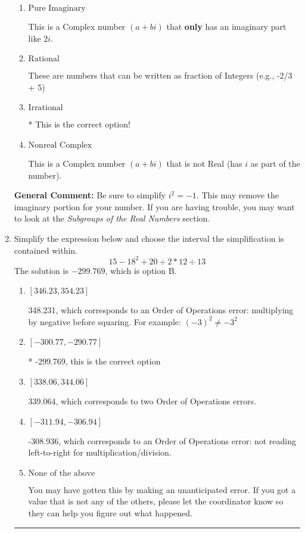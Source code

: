 \documentclass{extbook}[14pt]
\newcommand{\litem}[1]{\item #1

\rule{\textwidth}{0.4pt}}
\begin{document}
\begin{enumerate}
{\begin{enumerate}[label=\Alph*.]
This is not a number. The only non-Complex number we know is dividing by 0 as this is not a number!
\item \( \text{Pure Imaginary} \)

This is a Complex number $(a+bi)$ that \textbf{only} has an imaginary part like $2i$.
\item \( \text{Rational} \)

These are numbers that can be written as fraction of Integers (e.g., -2/3 + 5)
\item \( \text{Irrational} \)

* This is the correct option!
\item \( \text{Nonreal Complex} \)

This is a Complex number $(a+bi)$ that is not Real (has $i$ as part of the number).
\end{enumerate}

\textbf{General Comment:} Be sure to simplify $i^2 = -1$. This may remove the imaginary portion for your number. If you are having trouble, you may want to look at the \textit{Subgroups of the Real Numbers} section.
}
\litem{
Simplify the expression below and choose the interval the simplification is contained within.
\[ 15 - 18^2 + 20 \div 2 * 12 \div 13 \]The solution is \( -299.769 \), which is option B.\begin{enumerate}[label=\Alph*.]
\item \( [346.23, 354.23] \)

 348.231, which corresponds to an Order of Operations error: multiplying by negative before squaring. For example: $(-3)^2 \neq -3^2$
\item \( [-300.77, -290.77] \)

* -299.769, this is the correct option
\item \( [338.06, 344.06] \)

 339.064, which corresponds to two Order of Operations errors.
\item \( [-311.94, -306.94] \)

 -308.936, which corresponds to an Order of Operations error: not reading left-to-right for multiplication/division.
\item \( \text{None of the above} \)

 You may have gotten this by making an unanticipated error. If you got a value that is not any of the others, please let the coordinator know so they can help you figure out what happened.
\end{enumerate}

}
\end{enumerate}
\end{document}
